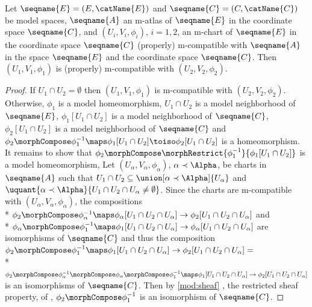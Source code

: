 \documentclass{article}
\begin{document}
\begin{lemma}
\label{lem:M-ATLextensions}
Let $\seqname{E}=(E,\catName{E})$ and $\seqname{C}=(C,\catName{C})$ be
model spaces, $\seqname{A}$ an m-atlas of $\seqname{E}$ in the
coordinate space $\seqname{C}$, and $(U_i,V_i,\phi_i)$, $i=1,2$, an
m-chart of $\seqname{E}$ in the coordinate space $\seqname{C}$
(properly) m-compatible with $\seqname{A}$ in the space $\seqname{E}$
and the coordinate space $\seqname{C}$.  Then $(U_1, V_1, \phi_1)$ is
(properly) m-compatible with $(U_2, V_2, \phi_2)$.

\begin{proof}
If $U_1 \cap U_2 = \emptyset$ then $(U_1, V_1, \phi_1)$ is m-compatible
with $(U_2 ,V_2, \phi_2)$. Otherwise, $\phi_1$ is a model homeomorphism,
$U_1 \cap U_2$ is a model neighborhood of $\seqname{E}$,
$\phi_1[U_1 \cap U_2]$ is a model neighborhood of $\seqname{C}$,
$\phi_2[U_1 \cap U_2]$ is a model neighborhood of $\seqname{C}$ and
$
  \phi_2 \morphCompose \phi^{-1}_1
  \maps \phi_1[U_1 \cap U_2] \toiso \phi_2[U_1 \cap U_2]
$
is a homeomorphism.  It remains to show that
$\phi_2 \morphCompose \morphRestrict{\phi^{-1}_1}{\phi_1[U_1 \cap U_2]}$ is a
model homeomorphism, Let
$(U_\alpha,V_\alpha,\phi_\alpha)$, $\alpha \prec \Alpha$, be charts in
$\seqname{A}$ such that
$U_1 \cap U_2 \subseteq \union[\alpha \prec \Alpha]{U_\alpha}$
and
\nobreaks
  {{
    $
      \uquant
        {
          \alpha \prec \Alpha
        }
        {
          U_1 \cap U_2 \cap U_\alpha \neq \emptyset
        }
    $.
  }}
Since the charts are m-compatible with
\nobreaks
  {{
    $(U_\alpha, V_\alpha, \phi_\alpha)$,
  }}
the compositions \\*
\nobreaks
  {{
    $
      \phi_2 \morphCompose \phi^{-1}_\alpha
      \maps \phi_\alpha[U_1 \cap U_2 \cap U_\alpha]
      \to \phi_2[U_1 \cap U_2 \cap U_\alpha]
    $
  }}
and \\*
\nobreaks
  {{
    $
      \phi_\alpha \morphCompose \phi^{-1}_1
      \maps \phi_1[U_1 \cap U_2 \cap U_\alpha]
      \to \phi_\alpha[U_1 \cap U_2 \cap U_\alpha]
    $
  }}
are isomorphisms of $\seqname{C}$ and thus the composition
\nobreaks
  {{
    $
      \phi_2 \morphCompose \phi^{-1}_1
      \maps \phi_1[U_1 \cap U_2 \cap U_\alpha]
      \to \phi_2[U_1 \cap U_2 \cap U_\alpha]
      =
    $
  }} \\*
\nobreaks
  {{
    $
      \phi_2 \morphCompose \phi^{-1}_\alpha \morphCompose
      \phi_\alpha \morphCompose \phi^{-1}_1
      \maps \phi_1[U_1 \cap U_2 \cap U_\alpha]
      \to \phi_2[U_1 \cap U_2 \cap U_\alpha]
    $
  }}
is an isomorphisms of $\seqname{C}$. Then by
{
  \showlabelsinline
  \cref{mod:sheaf}
},
the restricted sheaf property, of ,
$\phi_2 \morphCompose \phi^{-1}_1$
is an isomorphism of $\seqname{C}$.


\end{proof}
\end{lemma}
\end{document}
